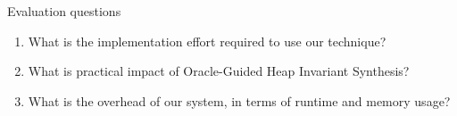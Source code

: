 \label{ch:eval}

Evaluation questions

\begin{enumerate}
\item What is the implementation effort required to use our technique?
\item What is practical impact of Oracle-Guided Heap Invariant Synthesis?
\item What is the overhead of our system, in terms of runtime and memory usage?
\end{enumerate}

